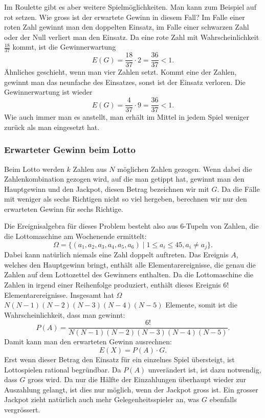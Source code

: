 Im Roulette gibt es aber weitere Spielmöglichkeiten.
Man kann zum Beispiel
auf rot setzen.
Wie gross ist der erwartete Gewinn in diesem Fall?
Im Falle einer roten Zahl gewinnt man den doppelten Einsatz,
im Falle einer schwarzen Zahl oder der Null verliert man den Einsatz.
Da eine rote Zahl mit Wahrscheinlichkeit $\frac{18}{37}$ kommt, ist
die Gewinnerwartung 
\[
E(G)=\frac{18}{37}\cdot 2=\frac{36}{37}<1.
\]
Ähnliches geschieht, wenn man vier Zahlen setzt.
Kommt eine der Zahlen,
gewinnt man das neunfache des Einsatzes, sonst ist der Einsatz 
verloren.
Die Gewinnerwartung ist wieder
\[
E(G)=\frac{4}{37}\cdot 9=\frac{36}{37}<1.
\]
Wie auch immer man es anstellt, man erhält im Mittel in jedem Spiel
weniger zurück als man eingesetzt hat.

\subsubsection{Erwarteter Gewinn beim Lotto}
Beim Lotto werden $k$ Zahlen aus $N$ möglichen Zahlen gezogen.
Wenn dabei die Zahlenkombination gezogen wird, auf die man getippt
hat, gewinnt man den Hauptgewinn und den Jackpot, diesen Betrag bezeichnen
wir mit $G$.
Da die Fälle mit
weniger als sechs Richtigen nicht so viel hergeben, berechnen wir
nur den erwarteten Gewinn für sechs Richtige.

Die Ereignisalgebra für dieses Problem besteht also aus 
6-Tupeln von Zahlen, die die Lottomaschine am Wochenende ermittelt:
\[
\Omega=\{(a_1, a_2, a_3, a_4, a_5, a_6)\;|\;1\le a_i\le 45, a_i\ne a_j\}.
\]
Dabei kann natürlich niemals eine Zahl doppelt auftreten.
Das Ereignis $A$, welches den Hauptgewinn bringt, enthält alle
Elementarereignisse, die genau die Zahlen auf dem Lottozettel des
Gewinners enthalten.
Da die Lottomaschine die Zahlen in irgend einer
Reihenfolge produziert, enthält dieses Ereignis $6!$ Elementarereignisse.
Insgesamt hat $\Omega$ $N(N-1)(N-2)(N-3)(N-4)(N-5)$ Elemente, somit ist
die Wahrscheinlichkeit, dass man gewinnt:
\[
P(A)=\frac{6!}{N(N-1)(N-2)(N-3)(N-4)(N-5)}.
\]
Damit
kann man den erwarteten Gewinn ausrechnen:
\[
E(X) = P(A)\cdot G.
\]
Erst wenn dieser Betrag den Einsatz für ein einzelnes Spiel übersteigt,
ist Lottospielen rational begründbar.
Da $P(A)$ unverändert ist,
ist dazu notwendig, dass $G$ gross wird.
Da nur die Hälfte der
Einzahlungen überhaupt wieder zur Auszahlung gelangt, ist dies nur
möglich, wenn der Jackpot gross ist.
Ein grosser Jackpot zieht natürlich
auch mehr Gelegenheitsspieler an, was $G$ ebenfalls vergrössert.
